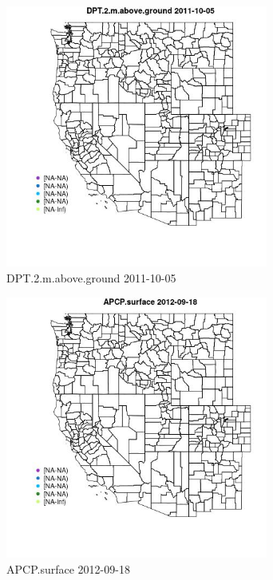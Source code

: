 \begin{figure} 
\centering  
\includegraphics[width=0.77\textwidth]{Code_Outputs/ML_input_report_ML_input_PM25_Step5_part_d_de_duplicated_aves_ML_input_MapObsDPT2maboveground2011-10-05.jpg} 
\caption{\label{fig:ML_input_report_ML_input_PM25_Step5_part_d_de_duplicated_aves_ML_inputMapObsDPT2maboveground2011-10-05}DPT.2.m.above.ground 2011-10-05} 
\end{figure} 
 

\begin{figure} 
\centering  
\includegraphics[width=0.77\textwidth]{Code_Outputs/ML_input_report_ML_input_PM25_Step5_part_d_de_duplicated_aves_ML_input_MapObsAPCPsurface2012-09-18.jpg} 
\caption{\label{fig:ML_input_report_ML_input_PM25_Step5_part_d_de_duplicated_aves_ML_inputMapObsAPCPsurface2012-09-18}APCP.surface 2012-09-18} 
\end{figure} 
 

